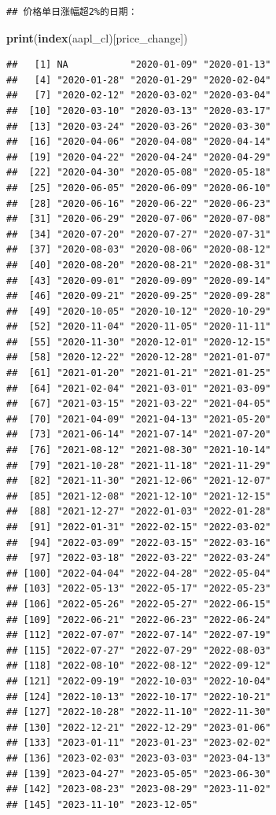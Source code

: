 \documentclass[]{ctexbook}
\newenvironment{Shaded}{\begin{snugshade}}{\end{snugshade}}
\newcommand{\FunctionTok}[1]{\textcolor[rgb]{0.13,0.29,0.53}{\textbf{#1}}}
\newcommand{\NormalTok}[1]{#1}
\begin{document}
\begin{verbatim}
## 价格单日涨幅超2%的日期：
\end{verbatim}

\begin{Shaded}
\begin{Highlighting}[]
\FunctionTok{print}\NormalTok{(}\FunctionTok{index}\NormalTok{(aapl\_cl)[price\_change])}
\end{Highlighting}
\end{Shaded}

\begin{verbatim}
##   [1] NA           "2020-01-09" "2020-01-13"
##   [4] "2020-01-28" "2020-01-29" "2020-02-04"
##   [7] "2020-02-12" "2020-03-02" "2020-03-04"
##  [10] "2020-03-10" "2020-03-13" "2020-03-17"
##  [13] "2020-03-24" "2020-03-26" "2020-03-30"
##  [16] "2020-04-06" "2020-04-08" "2020-04-14"
##  [19] "2020-04-22" "2020-04-24" "2020-04-29"
##  [22] "2020-04-30" "2020-05-08" "2020-05-18"
##  [25] "2020-06-05" "2020-06-09" "2020-06-10"
##  [28] "2020-06-16" "2020-06-22" "2020-06-23"
##  [31] "2020-06-29" "2020-07-06" "2020-07-08"
##  [34] "2020-07-20" "2020-07-27" "2020-07-31"
##  [37] "2020-08-03" "2020-08-06" "2020-08-12"
##  [40] "2020-08-20" "2020-08-21" "2020-08-31"
##  [43] "2020-09-01" "2020-09-09" "2020-09-14"
##  [46] "2020-09-21" "2020-09-25" "2020-09-28"
##  [49] "2020-10-05" "2020-10-12" "2020-10-29"
##  [52] "2020-11-04" "2020-11-05" "2020-11-11"
##  [55] "2020-11-30" "2020-12-01" "2020-12-15"
##  [58] "2020-12-22" "2020-12-28" "2021-01-07"
##  [61] "2021-01-20" "2021-01-21" "2021-01-25"
##  [64] "2021-02-04" "2021-03-01" "2021-03-09"
##  [67] "2021-03-15" "2021-03-22" "2021-04-05"
##  [70] "2021-04-09" "2021-04-13" "2021-05-20"
##  [73] "2021-06-14" "2021-07-14" "2021-07-20"
##  [76] "2021-08-12" "2021-08-30" "2021-10-14"
##  [79] "2021-10-28" "2021-11-18" "2021-11-29"
##  [82] "2021-11-30" "2021-12-06" "2021-12-07"
##  [85] "2021-12-08" "2021-12-10" "2021-12-15"
##  [88] "2021-12-27" "2022-01-03" "2022-01-28"
##  [91] "2022-01-31" "2022-02-15" "2022-03-02"
##  [94] "2022-03-09" "2022-03-15" "2022-03-16"
##  [97] "2022-03-18" "2022-03-22" "2022-03-24"
## [100] "2022-04-04" "2022-04-28" "2022-05-04"
## [103] "2022-05-13" "2022-05-17" "2022-05-23"
## [106] "2022-05-26" "2022-05-27" "2022-06-15"
## [109] "2022-06-21" "2022-06-23" "2022-06-24"
## [112] "2022-07-07" "2022-07-14" "2022-07-19"
## [115] "2022-07-27" "2022-07-29" "2022-08-03"
## [118] "2022-08-10" "2022-08-12" "2022-09-12"
## [121] "2022-09-19" "2022-10-03" "2022-10-04"
## [124] "2022-10-13" "2022-10-17" "2022-10-21"
## [127] "2022-10-28" "2022-11-10" "2022-11-30"
## [130] "2022-12-21" "2022-12-29" "2023-01-06"
## [133] "2023-01-11" "2023-01-23" "2023-02-02"
## [136] "2023-02-03" "2023-03-03" "2023-04-13"
## [139] "2023-04-27" "2023-05-05" "2023-06-30"
## [142] "2023-08-23" "2023-08-29" "2023-11-02"
## [145] "2023-11-10" "2023-12-05"
\end{verbatim}
\end{document}
